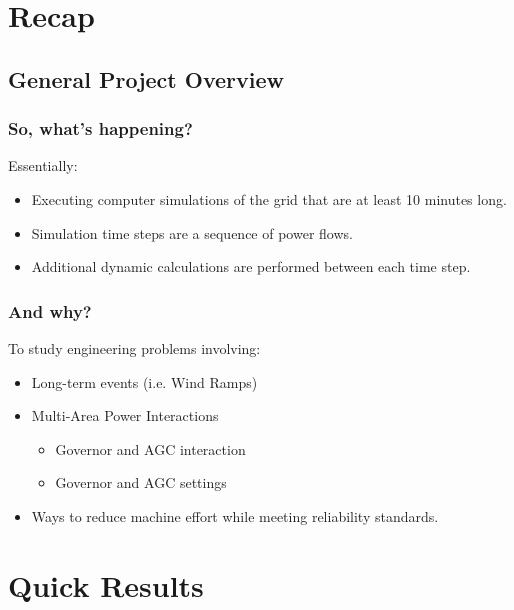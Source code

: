 \documentclass[14pt, unknownkeysallowed]{beamer}
\begin{document}
\section{Recap}
\subsection{General Project Overview}
\begin{frame}
\frametitle{So, what's happening?}
Essentially:
\begin{itemize}
	\item Executing computer simulations of the grid that are  at least 10 minutes long.
	\item Simulation time steps are a sequence of power flows.
	\item Additional dynamic calculations are performed between each time step.
\end{itemize}

\end{frame}
\begin{frame}
\frametitle{And why?}
To study engineering problems involving:
\begin{itemize}
	\item Long-term events (i.e. Wind Ramps)
	\item Multi-Area Power Interactions
	\begin{itemize}
		\item Governor and AGC interaction
		\item Governor and AGC settings		
	\end{itemize}
	\item Ways to reduce machine effort while meeting reliability standards.
\end{itemize}
\end{frame}
\section{Quick Results}
\end{document}

